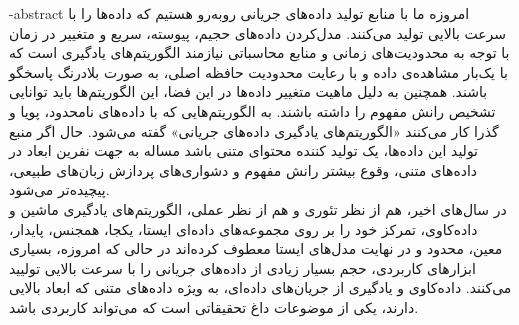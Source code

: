 \fa-abstract{
امروزه ما با منابع تولید داده‌های جریانی روبه‌رو هستیم که داده‌ها را با سرعت بالایی تولید می‌کنند. مدل‌کردن داده‌های حجیم، پیوسته، سریع و متغییر در زمان با توجه به محدودیت‌های زمانی و منابع محاسباتی نیازمند الگوریتم‌های یادگیری است‌ که با یک‌بار مشاهده‌ی داده و با رعایت محدودیت حافظه اصلی، به صورت بلادرنگ پاسخگو باشند. همچنین به دلیل ماهیت متغییر داده‌ها در این فضا، این الگوریتم‌ها باید توانایی تشخیص رانش مفهوم را داشته‌ باشند. به الگوریتم‌هایی که با داده‌های نامحدود، پویا و گذرا کار می‌کنند «الگوریتم‌های یادگیری داده‌های جریانی» گفته می‌شود. حال اگر منبع تولید این داده‌ها، یک تولید کننده محتوای متنی باشد مساله به جهت نفرین ابعاد در داده‌های متنی، وقوع بیشتر رانش مفهوم و دشواری‌های پردازش زبان‌های طبیعی، پیچیده‌تر می‌شود.
\\
در سال‌های اخیر، هم از نظر تئوری و هم از نظر عملی، الگوریتم‌های یادگیری ماشین و داده‌کاوی، تمرکز خود را بر روی مجموعه‌های داده‌ای ایستا، یکجا، همجنس، پایدار، معین، محدود و در نهایت مدل‌های ایستا معطوف کرده‌اند در حالی که امروزه، بسیاری ابزارهای کاربردی، حجم بسیار زیادی از داده‌های جریانی را با سرعت بالایی تولیید می‌کنند. داده‌کاوی و یادگیری از جریان‌های داده‌ای، به ویژه داده‌های متنی که ابعاد بالایی دارند، یکی از موضوعات داغ تحقیقاتی است که می‌تواند کاربردی باشد.
} 



